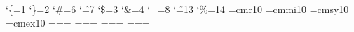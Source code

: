\catcode`\{=1 \catcode`\}=2 \catcode`\#=6 \catcode`\^=7 \catcode`\$=3 \catcode`\&=4 \catcode`\_=8
\catcode`\~=13 \catcode`\%=14
   
\hsize=300pt \vsize=500pt \parindent=10pt \baselineskip=12pt \lineskip=1pt \lineskiplimit=0pt
   
\font\tenrm=cmr10 \font\teni=cmmi10 \font\tensy=cmsy10 \font\tenex=cmex10
=\tenrm {}=\tenrm {}=\tenrm
{}=\teni {}=\teni {}=\teni
{}=\tensy {}=\tensy {}=\tensy
{}=\tenex {}=\tenex {}=\tenex
\tenrm

